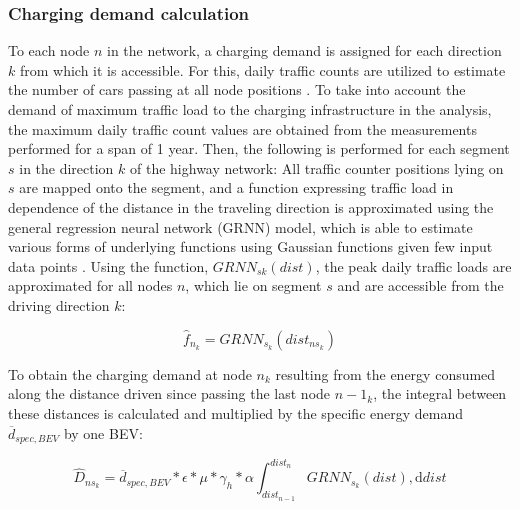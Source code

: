 \documentclass[journal,article,submit,pdftex,moreauthors]{Definitions/mdpi}
\begin{document}
    
    

    \subsubsection{Charging demand calculation}
    
    To each node $n$ in the network, a charging demand is assigned for each direction $k$ from which it is accessible. For this, daily traffic counts are utilized to estimate the number of cars passing  at all node positions . To take into account the demand of maximum traffic load to the charging infrastructure in the analysis, the maximum daily traffic count values are obtained from the measurements performed for a span of 1 year. 
    Then, the following is performed for each segment $s$ in the direction $k$ of the highway network: All traffic counter positions lying on $s$ are mapped onto the segment, and a function expressing traffic load in dependence of the distance in the traveling direction is approximated using the general regression neural network (GRNN) model, which is able to estimate various forms of underlying functions using Gaussian functions given few input data points \citep[][]{Gholamrezaei2007}. Using the function, $GRNN_{sk} (dist)$, the peak daily traffic loads are approximated for all nodes $n$, which lie on segment $s$ and are accessible from the driving direction $k$:
    
    
    \begin{linenomath}
        \begin{equation}
            \hat{f}_{n_k}=GRNN_{s_k} (dist_{ns_k})
        \end{equation}
    \end{linenomath}
    
    To obtain the charging demand at node $n_k$ resulting from the energy consumed along the distance driven since passing the last node $n-1_k$, the integral between these distances is calculated and multiplied by the specific energy demand $\overline{d}_{spec, BEV}$ by one BEV:

    \begin{linenomath}
        \begin{equation}
            \hat{D}_{ns_k} = \overline{d}_{spec, BEV} * \epsilon * \mu * \gamma_h * \alpha \int_{dist_{n-1}}^{dist_n} GRNN_{s_k} (dist),  \mathrm{d} dist 
        \end{equation}
    \end{linenomath}
    
\end{document}
